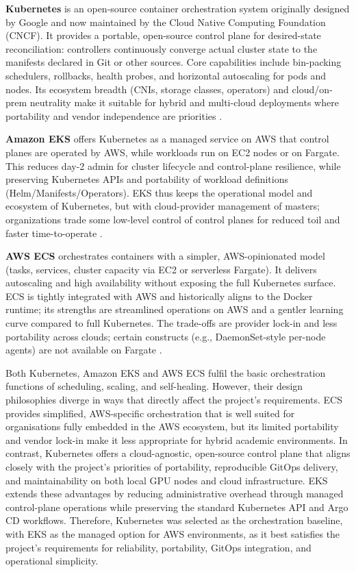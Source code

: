 \textbf{Kubernetes} is an open-source container orchestration system originally designed by Google and now maintained by the Cloud Native Computing Foundation (CNCF). It provides a portable, open-source control plane for desired-state reconciliation: controllers continuously converge actual cluster state to the manifests declared in Git or other sources. Core capabilities include bin-packing schedulers, rollbacks, health probes, and horizontal autoscaling for pods and nodes. Its ecosystem breadth (CNIs, storage classes, operators) and cloud/on-prem neutrality make it suitable for hybrid and multi-cloud deployments where portability and vendor independence are priorities \parencite{Kubernet67:online,Kubernet98:online}.

\textbf{Amazon EKS} offers Kubernetes as a managed service on AWS that control planes are operated by AWS, while workloads run on EC2 nodes or on Fargate. This reduces day-2 admin for cluster lifecycle and control-plane resilience, while preserving Kubernetes APIs and portability of workload definitions (Helm/Manifests/Operators). EKS thus keeps the operational model and ecosystem of Kubernetes, but with cloud-provider management of masters; organizations trade some low-level control of control planes for reduced toil and faster time-to-operate \parencite{Kubernet98:online}.

\textbf{AWS ECS} orchestrates containers with a simpler, AWS-opinionated model (tasks, services, cluster capacity via EC2 or serverless Fargate). It delivers autoscaling and high availability without exposing the full Kubernetes surface. ECS is tightly integrated with AWS and historically aligns to the Docker runtime; its strengths are streamlined operations on AWS and a gentler learning curve compared to full Kubernetes. The trade-offs are provider lock-in and less portability across clouds; certain constructs (e.g., DaemonSet-style per-node agents) are not available on Fargate \parencite{Kubernet98:online,RunConta17:online}.

Both Kubernetes, Amazon EKS and AWS ECS fulfil the basic orchestration functions of scheduling, scaling, and self-healing. However, their design philosophies diverge in ways that directly affect the project’s requirements. ECS provides simplified, AWS-specific orchestration that is well suited for organisations fully embedded in the AWS ecosystem, but its limited portability and vendor lock-in make it less appropriate for hybrid academic environments. In contrast, Kubernetes offers a cloud-agnostic, open-source control plane that aligns closely with the project’s priorities of portability, reproducible GitOps delivery, and maintainability on both local GPU nodes and cloud infrastructure. EKS extends these advantages by reducing administrative overhead through managed control-plane operations while preserving the standard Kubernetes API and Argo CD workflows. Therefore, Kubernetes was selected as the orchestration baseline, with EKS as the managed option for AWS environments, as it best satisfies the project’s requirements for reliability, portability, GitOps integration, and operational simplicity.

